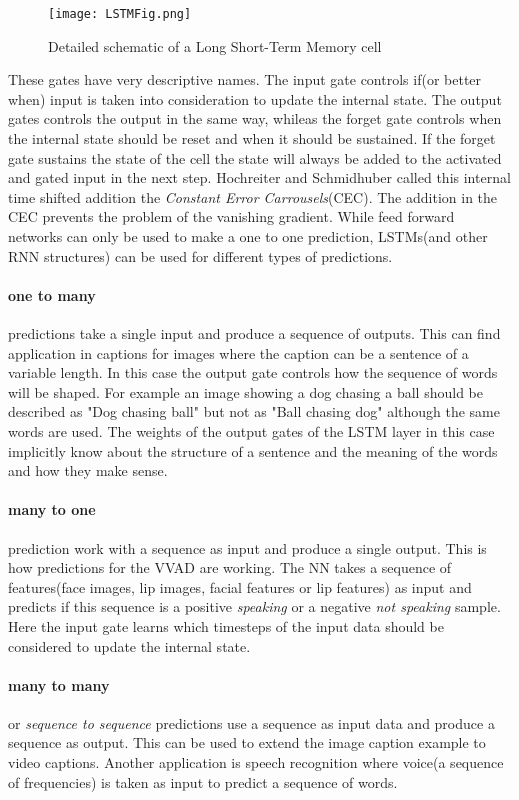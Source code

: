 \begin{figure}
\centering
  \texttt{[image: LSTMFig.png]}
  \caption{Detailed schematic of a Long Short-Term Memory cell \cite{LSTMFig}
}\label{fig:LSTMFig}
\end{figure}

These gates have very descriptive names.
The input gate controls if(or better when) input is taken into consideration to update the internal state.
The output gates controls the output in the same way, whileas the forget gate controls when the internal state should be reset and when it should be sustained.
If the forget gate sustains the state of the cell the state will always be added to the activated and gated input in the next step.
Hochreiter and Schmidhuber called this internal time shifted addition the \emph{Constant Error Carrousels}(CEC).
The addition in the CEC prevents the problem of the vanishing gradient.
While feed forward networks can only be used to make a one to one prediction, LSTMs(and other RNN structures) can be used for different types of predictions.
\paragraph{one to many} predictions take a single input and produce a sequence of outputs.
This can find application in captions for images where the caption can be a sentence of a variable length.
In this case the output gate controls how the sequence of words will be shaped. 
For example an image showing a dog chasing a ball should be described as "Dog chasing ball" but not as "Ball chasing dog" although the same words are used.
The weights of the output gates of the LSTM layer in this case implicitly know about the structure of a sentence and the meaning of the words and how they make sense.
\paragraph{many to one} prediction work with a sequence as input and produce a single output.
This is how predictions for the VVAD are working. The NN takes a sequence of features(face images, lip images, facial features or lip features) as input and predicts if this sequence is a positive \emph{speaking} or a negative \emph{not speaking} sample.
Here the input gate learns which timesteps of the input data should be considered to update the internal state.
\paragraph{many to many} or \emph{sequence to sequence} predictions use a sequence as input data and produce a sequence as output. 
This can be used to extend the image caption example to video captions. Another application is speech recognition where voice(a sequence of frequencies) is taken as input to predict a sequence of words.





 

